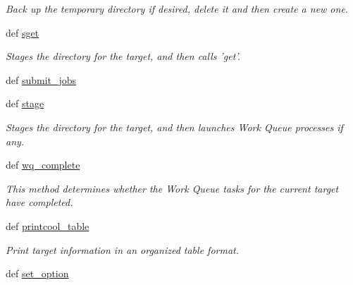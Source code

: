 \begin{DoxyCompactItemize}
\begin{DoxyCompactList}\small\item\em Back up the temporary directory if desired, delete it and then create a new one. \end{DoxyCompactList}\item 
def \hyperlink{classforcebalance_1_1target_1_1Target_a51d58b55242bf4d4909c1837174f5f3c}{sget}
\begin{DoxyCompactList}\small\item\em Stages the directory for the target, and then calls 'get'. \end{DoxyCompactList}\item 
def \hyperlink{classforcebalance_1_1target_1_1Target_a78cd29b94cbcc201eed99c78aaef46a4}{submit\-\_\-jobs}
\item 
def \hyperlink{classforcebalance_1_1target_1_1Target_af8d2a4658c87841e40296795aec478bb}{stage}
\begin{DoxyCompactList}\small\item\em Stages the directory for the target, and then launches Work Queue processes if any. \end{DoxyCompactList}\item 
def \hyperlink{classforcebalance_1_1target_1_1Target_af6099ec09486213869dba2491bd8ea04}{wq\-\_\-complete}
\begin{DoxyCompactList}\small\item\em This method determines whether the Work Queue tasks for the current target have completed. \end{DoxyCompactList}\item 
def \hyperlink{classforcebalance_1_1target_1_1Target_ac30a4e9d7d9fe06f7caefa5f7cfab09b}{printcool\-\_\-table}
\begin{DoxyCompactList}\small\item\em Print target information in an organized table format. \end{DoxyCompactList}\item 
def \hyperlink{classforcebalance_1_1BaseClass_a73e9a37a7632e79eb99f49bd15aced45}{set\-\_\-option}
\end{DoxyCompactItemize}
